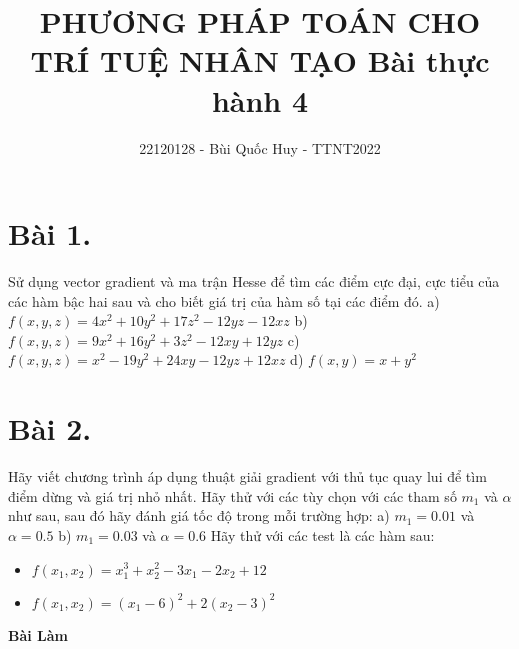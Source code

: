 \documentclass[11pt]{article}
\title{\textbf{PHƯƠNG PHÁP TOÁN CHO TRÍ TUỆ NHÂN TẠO \newline Bài thực hành 4}}
\author{22120128 - Bùi Quốc Huy - TTNT2022}
\begin{document}
\maketitle

\section*{Bài 1.} 
Sử dụng vector gradient và ma trận Hesse để tìm các điểm cực đại, cực tiểu của các hàm bậc hai sau và cho biết giá trị của hàm số tại các điểm đó.
\newline a) $ f(x, y, z) = 4x^2 + 10y^2 + 17z^2 - 12yz - 12xz $
\newline b) $ f(x, y, z) = 9x^2 + 16y^2 + 3z^2 - 12xy + 12yz $
\newline c) $ f(x, y, z) = x^2 - 19y^2 + 24xy - 12yz + 12xz $
\newline d) $ f(x, y) = x + y^2 $ 

\section*{Bài 2.}
Hãy viết chương trình áp dụng thuật giải gradient với thủ tục quay lui để tìm điểm dừng và giá trị nhỏ nhất. Hãy thử với các tùy chọn với các tham số $ m_1 $ và $ \alpha $ như sau, sau đó hãy đánh giá tốc độ trong mỗi trường hợp:
\newline a) $ m_1 = 0.01 $ và $ \alpha = 0.5 $
\newline b) $ m_1 = 0.03 $ và $ \alpha = 0.6 $
\newline Hãy thử với các test là các hàm sau:
\begin{itemize}
    \item $ f(x_1, x_2) = x_1^3 + x_2^2 - 3x_1 - 2x_2 + 12 $
    \item $ f(x_1, x_2) = (x_1 - 6)^2 + 2(x_2 - 3)^2 $
\end{itemize}

\begin{center}
    \textbf{Bài Làm}
\end{center}
 
\end{document}
